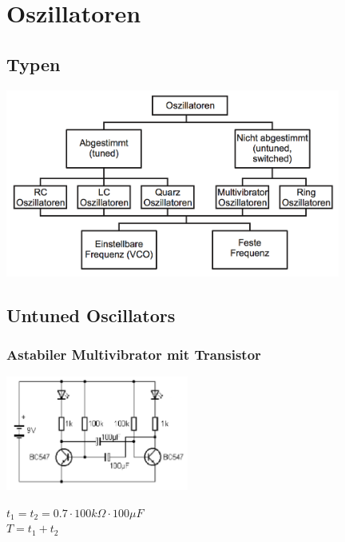 \section{Oszillatoren}
\subsection{Typen}
	\begin{center}
		\includegraphics[width=11cm]{./bilder/OszillatorKlassifikation.png}
	\end{center}

\subsection{Untuned Oscillators}
	\subsubsection{Astabiler Multivibrator mit Transistor}
	\begin{minipage}{6cm}
		\includegraphics[width=6cm]{./bilder/multiVibrator}
	\end{minipage}
	\begin{minipage}{10cm}
		$t_1 = t_2 = 0.7 \cdot 100k\Omega \cdot 100\mu F$ \\
		$T = t_1 + t_2$
	\end{minipage}

